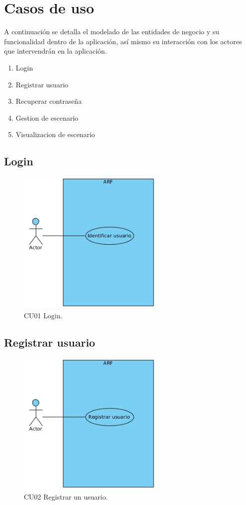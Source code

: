 \section{Casos de uso}
A continuación se detalla el modelado de las entidades de negocio y su funcionalidad dentro de la aplicación, así mismo su interacción con los actores que intervendrán en la aplicación.\par
\vspace{5mm}
\begin{enumerate}[1.]
\item Login
\item Registrar usuario
\item Recuperar contraseña
\item Gestion de escenario
\item Visualizacion de escenario
\end{enumerate}
\subsection{Login}
\begin{figure}[h!]
	\centering
	\includegraphics[width=7cm,height=7cm]{imagenes/analisis/login.jpg}
	\caption{CU01 Login.\cite{B27}}
	\label{fig:analogo}
\end{figure} \par \vspace{5mm}
\subsection{Registrar usuario} 
\begin{figure}[h!]
	\centering
	\includegraphics[width=7cm,height=7cm]{imagenes/analisis/registrarUsuario.jpg}
	\caption{CU02 Registrar un usuario.\cite{B27}}
	\label{fig:analogo}
\end{figure} \par \vspace{5mm}
